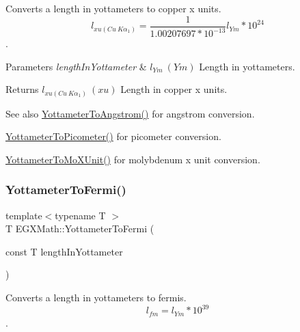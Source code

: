 Converts a length in yottameters to copper x units. \[ l_{xu(Cu\ K\alpha_1)}= \frac{1}{1.00207697*10^{-13}} l_{Ym} * 10^{24}\]. 


\begin{DoxyParams}{Parameters}
{\em length\+In\+Yottameter} & $ l_{Ym}\ (Ym)$ Length in yottameters. \\
\hline
\end{DoxyParams}
\begin{DoxyReturn}{Returns}
$ l_{xu(Cu\ K\alpha_1)}\ (xu)$ Length in copper x units. 
\end{DoxyReturn}
\begin{DoxySeeAlso}{See also}
\mbox{\hyperlink{group___e_g_x_math-_conversions-_length_conversions-_s_i-_yottameter-_non-_s_i_ga0129b788ceb2d7d4ce86c155ee9d4675}{Yottameter\+To\+Angstrom()}} for angstrom conversion. 

\mbox{\hyperlink{group___e_g_x_math-_conversions-_length_conversions-_s_i-_yottameter-_s_i_ga7af9d1314de06921546f079641c033b2}{Yottameter\+To\+Picometer()}} for picometer conversion. 

\mbox{\hyperlink{group___e_g_x_math-_conversions-_length_conversions-_s_i-_yottameter-_non-_s_i_ga545da9526f7a62f5ca7d1800faf17d1d}{Yottameter\+To\+Mo\+X\+Unit()}} for molybdenum x unit conversion. 
\end{DoxySeeAlso}
\mbox{\label{group___e_g_x_math-_conversions-_length_conversions-_s_i-_yottameter-_non-_s_i_gabf900c05975691fab8c5df7de16a467c}} 
\subsubsection{\texorpdfstring{Yottameter\+To\+Fermi()}{YottameterToFermi()}}
{\footnotesize\ttfamily template$<$typename T $>$ \\
T E\+G\+X\+Math\+::\+Yottameter\+To\+Fermi (\begin{DoxyParamCaption}\item[{const T}]{length\+In\+Yottameter }\end{DoxyParamCaption})}



Converts a length in yottameters to fermis. \[ l_{fm}=l_{Ym} * 10^{39} \]. 



